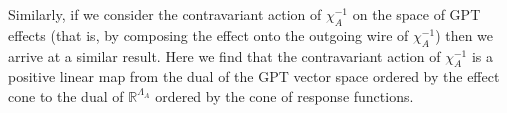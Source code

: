 \documentclass[10pt,twocolumn,aps,groupedaddress,nofootinbib]{revtex4}
\begin{document}
Similarly, if we consider the contravariant action of $\chi^{-1}_A$ on the space of GPT effects (that is, by composing the effect onto the outgoing wire of $\chi^{-1}_A$) then we arrive at a similar result. Here we find that the contravariant action of $\chi^{-1}_A$ is a positive linear map from the dual of the GPT vector space ordered by the effect cone to the dual of $\mathds{R}^{\Lambda_A}$ ordered by the cone of response functions.
\endproof
\end{document}
